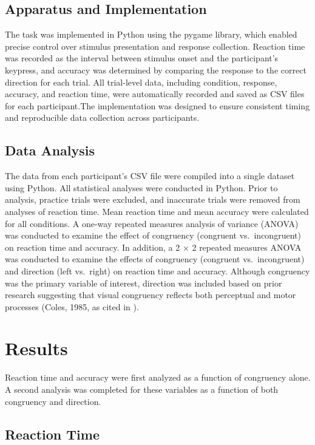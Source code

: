 \documentclass[
  authoryear,
  preprint]{elsarticle}
\begin{document}
\subsection{Apparatus and
Implementation}\label{apparatus-and-implementation}

The task was implemented in Python using the pygame library, which
enabled precise control over stimulus presentation and response
collection. Reaction time was recorded as the interval between stimulus
onset and the participant's keypress, and accuracy was determined by
comparing the response to the correct direction for each trial. All
trial-level data, including condition, response, accuracy, and reaction
time, were automatically recorded and saved as CSV files for each
participant.The implementation was designed to ensure consistent timing
and reproducible data collection across participants.

\subsection{Data Analysis}\label{data-analysis}

The data from each participant's CSV file were compiled into a single
dataset using Python. All statistical analyses were conducted in Python.
Prior to analysis, practice trials were excluded, and inaccurate trials
were removed from analyses of reaction time. Mean reaction time and mean
accuracy were calculated for all conditions. A one-way repeated measures
analysis of variance (ANOVA) was conducted to examine the effect of
congruency (congruent vs.~incongruent) on reaction time and accuracy. In
addition, a 2 × 2 repeated measures ANOVA was conducted to examine the
effects of congruency (congruent vs.~incongruent) and direction (left
vs.~right) on reaction time and accuracy. Although congruency was the
primary variable of interest, direction was included based on prior
research suggesting that visual congruency reflects both perceptual and
motor processes (Coles, 1985, as cited in \citet{stoffels1988}).

\section{Results}\label{results}

Reaction time and accuracy were first analyzed as a function of
congruency alone. A second analysis was completed for these variables as
a function of both congruency and direction.

\subsection{Reaction Time}\label{reaction-time}
\end{document}
